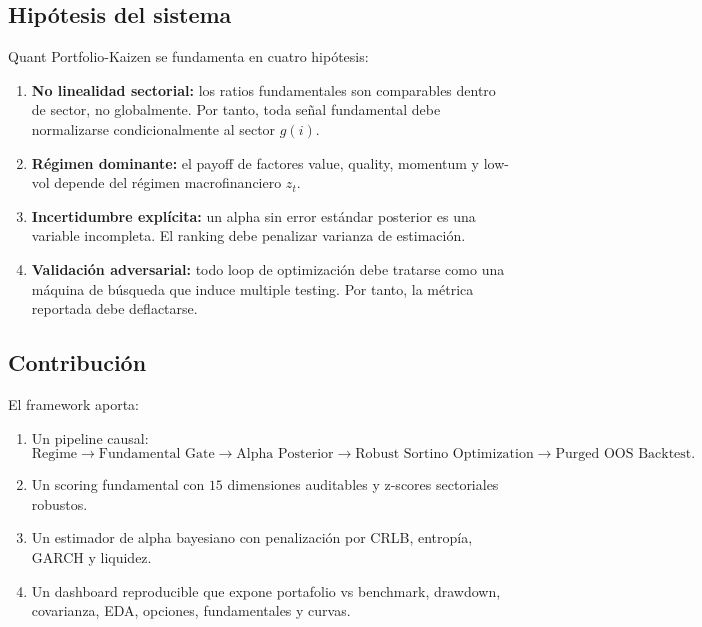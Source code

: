 \documentclass[11pt,letterpaper]{article}
\newcommand{\1}{\mathbf{1}}
\begin{document}
\subsection{Hipótesis del sistema}

Quant Portfolio-Kaizen se fundamenta en cuatro hipótesis:

\begin{enumerate}[label=\textbf{H\arabic*.}]
    \item \textbf{No linealidad sectorial:} los ratios fundamentales son comparables dentro de sector, no globalmente. Por tanto, toda señal fundamental debe normalizarse condicionalmente al sector \(g(i)\).
    \item \textbf{Régimen dominante:} el payoff de factores value, quality, momentum y low-vol depende del régimen macrofinanciero \(z_t\).
    \item \textbf{Incertidumbre explícita:} un alpha sin error estándar posterior es una variable incompleta. El ranking debe penalizar varianza de estimación.
    \item \textbf{Validación adversarial:} todo loop de optimización debe tratarse como una máquina de búsqueda que induce multiple testing. Por tanto, la métrica reportada debe deflactarse.
\end{enumerate}

\subsection{Contribución}

El framework aporta:

\begin{enumerate}
    \item Un pipeline causal:
    \[
        \text{Regime}
        \rightarrow
        \text{Fundamental Gate}
        \rightarrow
        \text{Alpha Posterior}
        \rightarrow
        \text{Robust Sortino Optimization}
        \rightarrow
        \text{Purged OOS Backtest}.
    \]
    \item Un scoring fundamental con \(15\) dimensiones auditables y z-scores sectoriales robustos.
    \item Un estimador de alpha bayesiano con penalización por CRLB, entropía, GARCH y liquidez.
    \item Un dashboard reproducible que expone portafolio vs benchmark, drawdown, covarianza, EDA, opciones, fundamentales y curvas.
\end{enumerate}

\newpage
\end{document}
